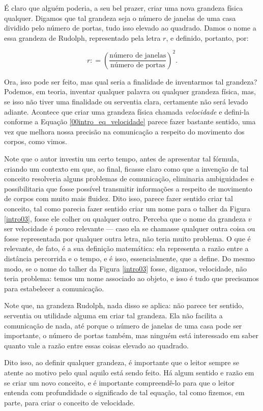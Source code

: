 \begin{itemize}
    É claro que alguém poderia, a seu bel prazer, criar uma nova grandeza física qualquer. Digamos que tal grandeza seja o número de janelas de uma casa dividido pelo número de portas, tudo isso elevado ao quadrado. Damos o nome a essa grandeza de Rudolph, representado pela letra $r$, e definido, portanto, por:

    $$ r : = \left( \dfrac{\text{número de janelas}}{\text{número de portas}} \right)^2.$$

    Ora, isso pode ser feito, mas qual seria a finalidade de inventarmos tal grandeza? Podemos, em teoria, inventar qualquer palavra ou qualquer grandeza física, mas, se isso não tiver uma finalidade ou serventia clara, certamente não será levado adiante. Acontece que criar uma grandeza física chamada \textit{velocidade} e defini-la conforme a Equação \eqref{00intro_eq_velocidade} parece fazer bastante sentido, uma vez que melhora nossa precisão na comunicação a respeito do movimento dos corpos, como vimos. 
    
    Note que o autor investiu um certo tempo, antes de apresentar tal fórmula, criando um contexto em que, ao final, ficasse claro como que a invenção de tal conceito resolveria alguns problemas de comunicação, eliminaria ambiguidades e possibilitaria que fosse possível transmitir informações a respeito de movimento de corpos com muito mais fluidez. Dito isso, parece fazer sentido criar tal conceito, tal como parecia fazer sentido criar um nome para o talher da Figura \ref{intro03}, fosse ele colher ou qualquer outro. Perceba que o nome da grandeza $v$ ser velocidade é pouco relevante --- caso ela se chamasse qualquer outra coisa ou fosse representada por qualquer outra letra, não teria muito problema. O que é relevante, de fato, é a sua definição matemática: ela representa a razão entre a distância percorrida e o tempo, e é isso, essencialmente, que a define. Do mesmo modo, se o nome do talher da Figura \ref{intro03} fosse, digamos, velocidade, não teria problema: temos um nome associado ao objeto, e isso é tudo que precisamos para estabelecer a comunicação.

    Note que, na grandeza Rudolph, nada disso se aplica: não parece ter sentido, serventia ou utilidade alguma em criar tal grandeza. Ela não facilita a comunicação de nada, até porque o número de janelas de uma casa pode ser importante, o número de portas também, mas ninguém está interessado em saber quanto vale a razão entre essas coisas elevado ao quadrado.

    Dito isso, ao definir qualquer grandeza, é importante que o leitor sempre se atente ao motivo pelo qual aquilo está sendo feito. Há algum sentido e razão em se criar um novo conceito, e é importante compreendê-lo para que o leitor entenda com profundidade o significado de tal equação, tal como fizemos, em parte, para criar o conceito de velocidade.


\end{itemize}
